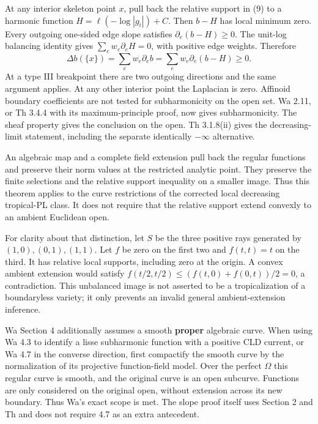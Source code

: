\documentclass[
  11pt,
]{article}
\begin{document}
At any interior skeleton point \(x\), pull back the relative support in
(9) to a harmonic function \(H=\ell(-\log|g_i|)+C\). Then \(b-H\) has
local minimum zero. Every outgoing one-sided edge slope satisfies
\(\partial_e(b-H)\ge0\). The unit-log balancing identity gives
\(\sum_e w_e\partial_e H=0\), with positive edge weights. Therefore
\[\Delta b(\{x\})=\sum_e w_e\partial_e b
                   =\sum_e w_e\partial_e(b-H)\ge0.                   \tag{10}\]
At a type III breakpoint there are two outgoing directions and the same
argument applies. At any other interior point the Laplacian is zero.
Affinoid boundary coefficients are not tested for subharmonicity on the
open set. Wa 2.11, or Th 3.4.4 with its maximum-principle proof, now
gives subharmonicity. The sheaf property gives the conclusion on the
open. Th 3.1.8(ii) gives the decreasing-limit statement, including the
separate identically \(-\infty\) alternative.

An algebraic map and a complete field extension pull back the regular
functions and preserve their norm values at the restricted analytic
point. They preserve the finite selections and the relative support
inequality on a smaller image. Thus this theorem applies to the curve
restrictions of the corrected local decreasing tropical-PL class. It
does not require that the relative support extend convexly to an ambient
Euclidean open.

For clarity about that distinction, let \(S\) be the three positive rays
generated by \((1,0),(0,1),(1,1)\). Let \(f\) be zero on the first two
and \(f(t,t)=t\) on the third. It has relative local supports, including
zero at the origin. A convex ambient extension would satisfy
\(f(t/2,t/2)\le(f(t,0)+f(0,t))/2=0\), a contradiction. This unbalanced
image is not asserted to be a tropicalization of a boundaryless variety;
it only prevents an invalid general ambient-extension inference.

Wa Section 4 additionally assumes a smooth \textbf{proper} algebraic
curve. When using Wa 4.3 to identify a lisse subharmonic function with a
positive CLD current, or Wa 4.7 in the converse direction, first
compactify the smooth curve by the normalization of its projective
function-field model. Over the perfect \(\Omega\) this regular curve is
smooth, and the original curve is an open subcurve. Functions are only
considered on the original open, without extension across its new
boundary. Thus Wa's exact scope is met. The slope proof itself uses
Section 2 and Th and does not require 4.7 as an extra antecedent.
\end{document}
